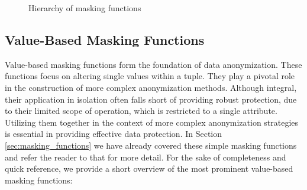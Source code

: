 \begin{figure}[ht]
    \caption{Hierarchy of masking functions}\label{fig:hierarchy_mf} 
\end{figure}

\subsection{Value-Based Masking Functions}
Value-based masking functions form the foundation of data anonymization. These functions focus on altering single values within a tuple. They play a pivotal role in the construction of more complex anonymization methods. Although integral, their application in isolation often falls short of providing robust protection, due to their limited scope of operation, which is restricted to a single attribute. Utilizing them together in the context of more complex anonymization strategies is essential in providing effective data protection. In Section \ref{sec:masking_functions} we have already covered these simple masking functions and refer the reader to that for more detail. For the sake of completeness and quick reference, we provide a short overview of the most prominent value-based masking functions: 

